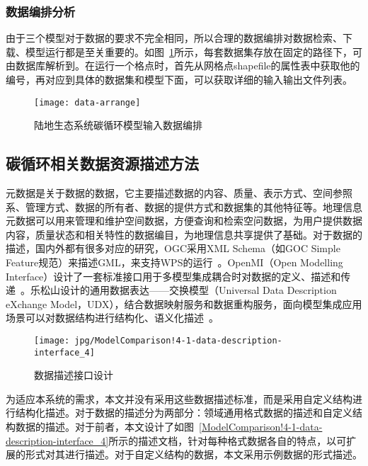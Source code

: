 \subsubsection{数据编排分析}
\label{subsubsec:data-arrange}
由于三个模型对于数据的要求不完全相同，所以合理的数据编排对数据检索、下载、模型运行都是至关重要的。如图~\ref{fig:data-arrange}所示，每套数据集存放在固定的路径下，可由数据库解析到。在运行一个格点时，首先从网格点shapefile的属性表中获取他的编号，再对应到具体的数据集和模型下面，可以获取详细的输入输出文件列表。

\begin{figure}[!htbp]
    \centering
    \texttt{[image: data-arrange]}
    \caption{陆地生态系统碳循环模型输入数据编排}
    \label{fig:data-arrange}
\end{figure}

\subsection{碳循环相关数据资源描述方法}
\label{sec:data-desc}

元数据是关于数据的数据，它主要描述数据的内容、质量、表示方式、空间参照系、管理方式、数据的所有者、数据的提供方式和数据集的其他特征等。地理信息元数据可以用来管理和维护空间数据，方便查询和检索空问数据，为用户提供数据内容，质量状态和相关特性的数据编目，为地理信息共享提供了基础。对于数据的描述，国内外都有很多对应的研究，OGC采用XML Schema（如GOC Simple Feature规范）来描述GML，来支持WPS的运行~\cite{OGC-WPS}。OpenMI（Open Modelling Interface）设计了一套标准接口用于多模型集成耦合时对数据的定义、描述和传递~\cite{MOORE2005279}。乐松山设计的通用数据表达——交换模型（Universal Data Description eXchange Model，UDX），结合数据映射服务和数据重构服务，面向模型集成应用场景可以对数据结构进行结构化、语义化描述~\cite{乐松山2016面向地理模型共享与集成的数据适配方法研究}。

\begin{figure}[!htbp]
    \centering
    \texttt{[image: jpg/ModelComparison!4-1-data-description-interface\_4]}
    \caption{数据描述接口设计}
    \label{fig:ModelComparison!4-1-data-description-interface_4}
\end{figure}

为适应本系统的需求，本文并没有采用这些数据描述标准，而是采用自定义结构进行结构化描述。对于数据的描述分为两部分：领域通用格式数据的描述和自定义结构数据的描述。对于前者，本文设计了如图~\ref{ModelComparison!4-1-data-description-interface_4}所示的描述文档，针对每种格式数据各自的特点，以可扩展的形式对其进行描述。对于自定义结构的数据，本文采用示例数据的形式描述。

